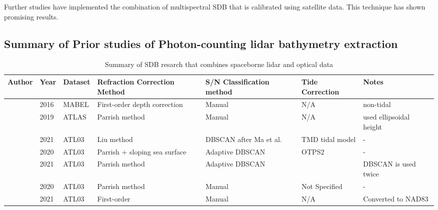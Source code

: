 Further studies have implemented the combination of multispectral SDB that is calibrated using satellite data. This technique has shown promising results.



\subsection{Summary of Prior studies of Photon-counting lidar bathymetry extraction}
\begin{landscape}
      \begin{table}
            \caption{Summary of SDB resarch that combines spaceborne lidar and optical data}
            \raggedright
            \begin{tabular}{lllp{3cm}p{3cm}ll}
                  \midrule
                  Author                                               & Year & Dataset & Refraction Correction Method  & S/N Classification method      & Tide Correction & Notes                        \\
                  \hline
                  \citeauthor{Forfinski-Sarkozi2016} & 2016 & MABEL   & First-order depth correction  & Manual                         & N/A             & non-tidal                    \\
                  \citeauthor{Parrish2019}                    & 2019 & ATLAS   & Parrish method                & Manual                         & N/A             & used  ellipsoidal height     \\
                  \citeauthor{Liu2021}                             & 2021 & ATL03   & Liu method                    & DBSCAN after Ma et al.         & TMD tidal model & -                            \\
                  \citeauthor{Ma2020}                             & 2020 & ATL03   & Parrish + sloping sea surface & Adaptive DBSCAN                & OTPS2           & -                            \\
                  \citeauthor{Xie2021}                            & 2021 & ATL03   & Parrish method                & Adaptive DBSCAN                &                 & DBSCAN  is used twice        \\
                  \citeauthor{Thomas2021d}                     & 2020 & ATL03   & Parrish method                & Manual                         & Not Specified   & -                            \\
                  \citeauthor{Albright2021}             & 2021 & ATL03   & First-order                   & Manual                         & N/A             & Converted to NAD83           \\

\end{tabular}
\end{table}
\end{landscape}
